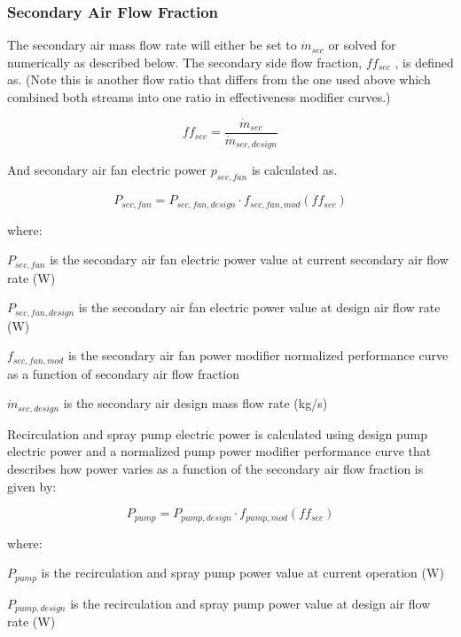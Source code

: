 \subsubsection{Secondary Air Flow Fraction}\label{secondary-air-flow-fraction}

The secondary air mass flow rate will either be set to \(\dot{m}_{sec}\) or solved for numerically as described below. The secondary side flow fraction, \(ff_{sec}\) , is defined as. (Note this is another flow ratio that differs from the one used above which combined both streams into one ratio in effectiveness modifier curves.)

\begin{equation}
ff_{sec} = \frac{\dot{m}_{sec}}{\dot{m}_{sec,design}}
\end{equation}

And secondary air fan electric power \(p_{sec,fan}\) is calculated as.

\begin{equation}
P_{sec,fan} = P_{sec,fan,design}\cdot f_{sec,fan,mod}\left(ff_{sec}\right)
\end{equation}

where:

\(P_{sec,fan}\) is the secondary air fan electric power value at current secondary air flow rate (W)

\(P_{sec,fan,design}\) is the secondary air fan electric power value at design air flow rate (W)

\(f_{sec,fan,mod}\) is the secondary air fan power modifier normalized performance curve as a function of secondary air flow fraction

\(\dot{m}_{sec,design}\) is the secondary air design mass flow rate (kg/s)

Recirculation and spray pump electric power is calculated using design pump electric power and a normalized pump power modifier performance curve that describes how power varies as a function of the secondary air flow fraction is given by:

\begin{equation}
P_{pump} = P_{pump,design}\cdot f_{pump,mod}\left(ff_{sec}\right)
\end{equation}

where:

\(P_{pump}\) is the recirculation and spray pump power value at current operation (W)

\(P_{pump,design}\) is the recirculation and spray pump power value at design air flow rate (W)

